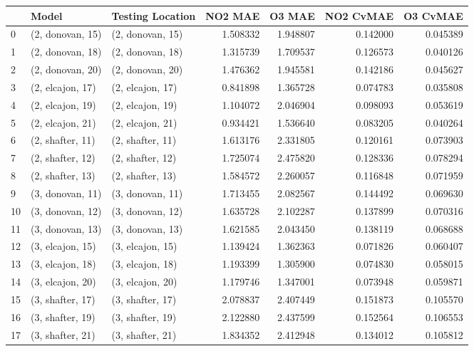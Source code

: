 \begin{tabular}{lllrrrr}
\toprule
{} &             Model &  Testing Location &   NO2 MAE &    O3 MAE &  NO2 CvMAE &  O3 CvMAE \\
\midrule
0  &  (2, donovan, 15) &  (2, donovan, 15) &  1.508332 &  1.948807 &   0.142000 &  0.045389 \\
1  &  (2, donovan, 18) &  (2, donovan, 18) &  1.315739 &  1.709537 &   0.126573 &  0.040126 \\
2  &  (2, donovan, 20) &  (2, donovan, 20) &  1.476362 &  1.945581 &   0.142186 &  0.045627 \\
3  &  (2, elcajon, 17) &  (2, elcajon, 17) &  0.841898 &  1.365728 &   0.074783 &  0.035808 \\
4  &  (2, elcajon, 19) &  (2, elcajon, 19) &  1.104072 &  2.046904 &   0.098093 &  0.053619 \\
5  &  (2, elcajon, 21) &  (2, elcajon, 21) &  0.934421 &  1.536640 &   0.083205 &  0.040264 \\
6  &  (2, shafter, 11) &  (2, shafter, 11) &  1.613176 &  2.331805 &   0.120161 &  0.073903 \\
7  &  (2, shafter, 12) &  (2, shafter, 12) &  1.725074 &  2.475820 &   0.128336 &  0.078294 \\
8  &  (2, shafter, 13) &  (2, shafter, 13) &  1.584572 &  2.260057 &   0.116848 &  0.071959 \\
9  &  (3, donovan, 11) &  (3, donovan, 11) &  1.713455 &  2.082567 &   0.144492 &  0.069630 \\
10 &  (3, donovan, 12) &  (3, donovan, 12) &  1.635728 &  2.102287 &   0.137899 &  0.070316 \\
11 &  (3, donovan, 13) &  (3, donovan, 13) &  1.621585 &  2.043450 &   0.138119 &  0.068688 \\
12 &  (3, elcajon, 15) &  (3, elcajon, 15) &  1.139424 &  1.362363 &   0.071826 &  0.060407 \\
13 &  (3, elcajon, 18) &  (3, elcajon, 18) &  1.193399 &  1.305900 &   0.074830 &  0.058015 \\
14 &  (3, elcajon, 20) &  (3, elcajon, 20) &  1.179746 &  1.347001 &   0.073948 &  0.059871 \\
15 &  (3, shafter, 17) &  (3, shafter, 17) &  2.078837 &  2.407449 &   0.151873 &  0.105570 \\
16 &  (3, shafter, 19) &  (3, shafter, 19) &  2.122880 &  2.437599 &   0.152564 &  0.106553 \\
17 &  (3, shafter, 21) &  (3, shafter, 21) &  1.834352 &  2.412948 &   0.134012 &  0.105812 \\

\end{tabular}
